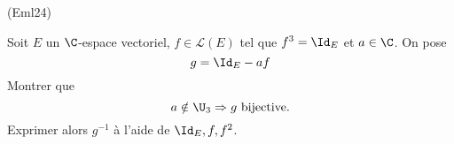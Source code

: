 \begin{tiny}(Eml24)\end{tiny} Soit $E$ un $\C$-espace vectoriel, $f\in \mathcal{L}(E)$ tel que $f^3 = \Id_E$ et $a\in \C$. On pose
\begin{displaymath}
  g = \Id_E - af
\end{displaymath}
Montrer que 
\[
 a\notin \U_3 \Rightarrow g \text{ bijective.}
\]
Exprimer alors $g^{-1}$ à l'aide de $\Id_E, f, f^2$.